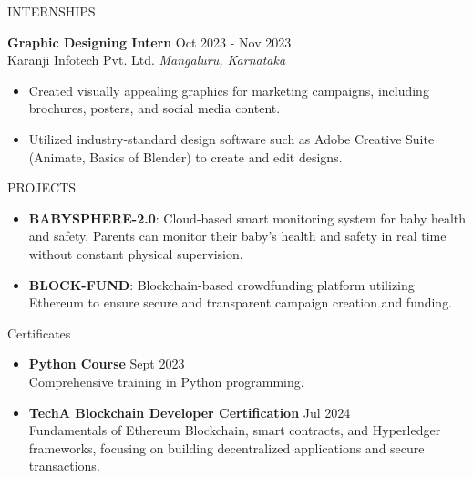 \documentclass{resume} %
\begin{document}
\begin{rSection}{INTERNSHIPS}

\textbf{Graphic Designing Intern} \hfill Oct 2023 - Nov 2023\\
Karanji Infotech Pvt. Ltd. \hfill \textit{Mangaluru, Karnataka}
 \begin{itemize}
    \itemsep -3pt {} 
     \item Created visually appealing graphics for marketing campaigns, including brochures, posters, and social media content.
    \item Utilized industry-standard design software such as Adobe Creative Suite (Animate, Basics of Blender) to create and edit designs. 
 \end{itemize}

\end{rSection} 


\begin{rSection}{PROJECTS}
\begin{itemize}
\item \textbf{BABYSPHERE-2.0}: Cloud-based smart monitoring system for baby health and safety. Parents can monitor their baby’s health and safety in real time without constant physical supervision.
\item \textbf{BLOCK-FUND}: Blockchain-based crowdfunding platform utilizing Ethereum to ensure secure and transparent campaign creation and funding.
\end{itemize}

\end{rSection} 

\begin{rSection}{Certificates} 
    \begin{itemize}
        \item \textbf{Python Course} \hfill Sept 2023\\
        Comprehensive training in Python programming.
        \item \textbf{TechA Blockchain Developer Certification} \hfill Jul 2024\\
        Fundamentals of Ethereum Blockchain, smart contracts, and Hyperledger frameworks, focusing on building decentralized applications and secure transactions.
    \end{itemize}
\end{rSection}
\end{document}

